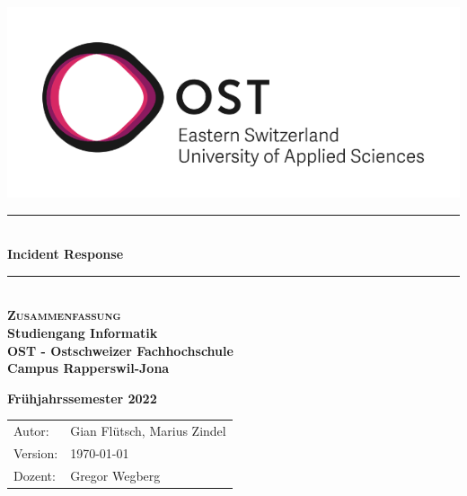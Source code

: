 


\begin{titlepage}


   \newcommand{\HRule}{\color{black}\rule{\linewidth}{0.5mm}} %
   
   \center
   
   \begin{minipage}{0.49\linewidth}
         \vspace{2pt}
        \hfill
   \end{minipage}
   \begin{minipage}{0.49\linewidth}
      \hfill
      \includegraphics[width=0.6\linewidth]{img/OST_Logo}
   \end{minipage}

   \vspace*{\fill}

   \vspace{1.5cm}

   {\HRule} \\[0.7cm]
   {\huge \bfseries Incident Response}\\[0.4cm]
   
   {\HRule} \\[1.5cm]
   
   \textbf{\textsc{\Huge Zusammenfassung}}\\[1.5cm]
   
   \Large
   \textbf{Studiengang Informatik}\\
   \textbf{OST - Ostschweizer Fachhochschule}\\
   \textbf{Campus Rapperswil-Jona}\\
   
   \vspace{1cm}
   
   \textbf{Frühjahrssemester 2022}\\
   
   \vspace{1.5cm}

   \begin{center}
      \begin{tabular} {|p{3cm} p{6cm}|}
         Autor:          &     Gian Flütsch, Marius Zindel     \\
         Version:          &     \today         \\
         Dozent:         &     Gregor Wegberg    \\
      \end{tabular}
   \end{center}



   \vfill %

\end{titlepage}


\setcounter{tocdepth}{1}


